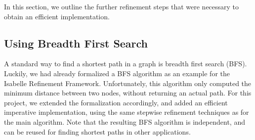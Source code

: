 \documentclass[smallcondensed]{svjour3}     %
\begin{document}
  In this section, we outline the further refinement steps that were necessary to obtain an efficient implementation.

  \subsection{Using Breadth First Search}
  A standard way to find a shortest path in a graph is breadth first search (BFS). Luckily, we had already formalized a BFS algorithm as an example for the 
  Isabelle Refinement Framework. Unfortunately, this algorithm only computed the minimum distance between two nodes, without returning an actual path. For this project, we extended the formalization accordingly, and added an efficient imperative implementation, using the same stepwise refinement techniques as for the main algorithm. Note that the resulting BFS algorithm is independent, and can be reused for finding shortest paths in other applications. 
  
  
%   
% 
%   
%   
     
\end{document}
